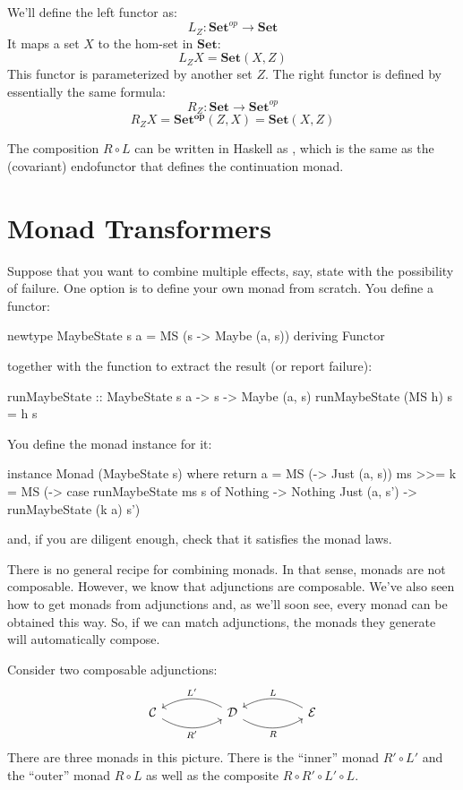 \documentclass[DaoFP]{subfiles}
\begin{document}
We'll define the left functor as:
\[ L_Z \colon \mathbf{Set}^{op} \to \mathbf{Set} \] 
It maps a set $X$ to the hom-set in $\mathbf{Set}$:
\[ L_Z X = \mathbf{Set}(X, Z) \] 
This functor is parameterized by another set $Z$. The right functor is defined by essentially the same formula:
\[ R_Z \colon \mathbf{Set} \to \mathbf{Set}^{op} \] 
\[ R_Z X = \mathbf{Set^{op}}(Z, X)  = \mathbf{Set}(X, Z) \] 


The composition $R \circ L$ can be written in Haskell as , which is the same as the (covariant) endofunctor that defines the continuation monad.

\section{Monad Transformers}

Suppose that you want to combine multiple effects, say, state with the possibility of failure. One option is to define your own monad from scratch. You define a functor:
\begin{haskell}
newtype MaybeState s a = MS (s -> Maybe (a, s))
  deriving Functor
\end{haskell}
together with the function to extract the result (or report failure):
\begin{haskell}
runMaybeState :: MaybeState s a -> s -> Maybe (a, s)
runMaybeState (MS h) s = h s
\end{haskell}
You define the monad instance for it:
\begin{haskell}
instance Monad (MaybeState s) where
  return a = MS (\s -> Just (a, s))
  ms >>= k = MS (\s -> case runMaybeState ms s of
                       Nothing -> Nothing
                       Just (a, s') -> runMaybeState (k a) s')
\end{haskell}
and, if you are diligent enough, check that it satisfies the monad laws.

There is no general recipe for combining monads. In that sense, monads are not composable. However, we know that adjunctions are composable. We've also seen how to get monads from adjunctions and, as we'll soon see, every monad can be obtained this way. So, if we can match adjunctions, the monads they generate will automatically compose.

Consider two composable adjunctions:
\[
 \begin{tikzcd}
  \mathcal{C}
  \arrow[rr, bend right, "R'"']
  &&
  \mathcal{D}
  \arrow[ll, bend right, "L'"']
    \arrow[rr, bend right, "R"']
&&
  \mathcal{E}
  \arrow[ll, bend right, "L"']
 \end{tikzcd}
\]
There are three monads in this picture. There is the ``inner'' monad $R' \circ L'$ and the ``outer'' monad $R \circ L$ as well as the composite $R \circ R' \circ L' \circ L$. 
\end{document}
